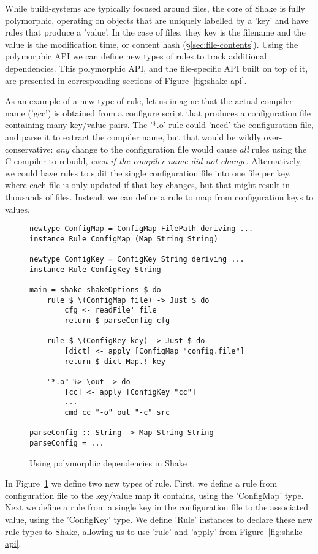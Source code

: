 While build-systems are typically focused around files, the core of Shake is
fully polymorphic, operating on objects that are uniquely labelled by a
\lst'key' and have rules that produce a \lst'value'.
In the case of files, they key is the filename and the value is the modification
time, or content hash (\S\ref{sec:file-contents}).
Using the polymorphic API we can define new types of rules to track additional
dependencies.
This polymorphic API, and the file-specific API built on top
of it, are presented in corresponding sections of Figure~\ref{fig:shake-api}.

As an example of a new type of rule, let us imagine that the actual compiler
name (\lst'gcc') is obtained from a configure script that produces a
configuration file containing many key/value pairs. The \lst'*.o' rule could
\lst'need' the configuration file, and parse it to extract the compiler name,
but that would be wildly over-conservative: \emph{any} change to the
configuration file would cause \emph{all} rules using the C compiler to rebuild,
\emph{even if the compiler name did not change}. Alternatively, we could have rules to split
the single configuration file into one file per key, where each file is only
updated if that key changes, but that might result in thousands of files.
Instead, we can define a rule to map from configuration keys to values.

\begin{figure}
\begin{lstlisting}
newtype ConfigMap = ConfigMap FilePath deriving ...
instance Rule ConfigMap (Map String String)

newtype ConfigKey = ConfigKey String deriving ...
instance Rule ConfigKey String

main = shake shakeOptions $ do
    rule $ \(ConfigMap file) -> Just $ do
        cfg <- readFile' file
        return $ parseConfig cfg

    rule $ \(ConfigKey key) -> Just $ do
        [dict] <- apply [ConfigMap "config.file"]
        return $ dict Map.! key

    "*.o" %> \out -> do
        [cc] <- apply [ConfigKey "cc"]
        ...
        cmd cc "-o" out "-c" src

parseConfig :: String -> Map String String
parseConfig = ...
\end{lstlisting}
\caption{Using polymorphic dependencies in Shake\label{fig:polymorphic-deps}}
\end{figure}

In Figure~\ref{fig:polymorphic-deps} we define two new types of rule. First, we
define a rule from configuration file to the key/value map it contains, using the
\lst'ConfigMap' type. Next we define a rule from a single key in the configuration file to the associated value,
using the \lst'ConfigKey' type. We define \lst'Rule' instances to declare these
new rule types to Shake, allowing us to use \lst'rule' and \lst'apply' from
Figure~\ref{fig:shake-api}.

